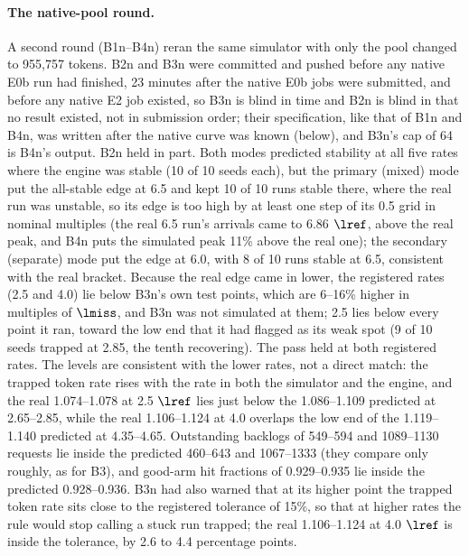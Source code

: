 \paragraph{The native-pool round.} A second round (B1n--B4n) reran the same simulator with only the pool changed to 955,757 tokens. B2n and B3n were committed and pushed before any native E0b run had finished, 23 minutes after the native E0b jobs were submitted, and before any native E2 job existed, so B3n is blind in time and B2n is blind in that no result existed, not in submission order; their specification, like that of B1n and B4n, was written after the native curve was known (below), and B3n's cap of 64 is B4n's output. B2n held in part. Both modes predicted stability at all five rates where the engine was stable (10 of 10 seeds each), but the primary (mixed) mode put the all-stable edge at 6.5 and kept 10 of 10 runs stable there, where the real run was unstable, so its edge is too high by at least one step of its 0.5 grid in nominal multiples (the real 6.5 run's arrivals came to 6.86 $\lref$, above the real peak, and B4n puts the simulated peak 11\% above the real one); the secondary (separate) mode put the edge at 6.0, with 8 of 10 runs stable at 6.5, consistent with the real bracket. Because the real edge came in lower, the registered rates (2.5 and 4.0) lie below B3n's own test points, which are 6--16\% higher in multiples of $\lmiss$, and B3n was not simulated at them; 2.5 lies below every point it ran, toward the low end that it had flagged as its weak spot (9 of 10 seeds trapped at 2.85, the tenth recovering). The pass held at both registered rates. The levels are consistent with the lower rates, not a direct match: the trapped token rate rises with the rate in both the simulator and the engine, and the real 1.074--1.078 at 2.5 $\lref$ lies just below the 1.086--1.109 predicted at 2.65--2.85, while the real 1.106--1.124 at 4.0 overlaps the low end of the 1.119--1.140 predicted at 4.35--4.65. Outstanding backlogs of 549--594 and 1089--1130 requests lie inside the predicted 460--643 and 1067--1333 (they compare only roughly, as for B3), and good-arm hit fractions of 0.929--0.935 lie inside the predicted 0.928--0.936. B3n had also warned that at its higher point the trapped token rate sits close to the registered tolerance of 15\%, so that at higher rates the rule would stop calling a stuck run trapped; the real 1.106--1.124 at 4.0 $\lref$ is inside the tolerance, by 2.6 to 4.4 percentage points.

